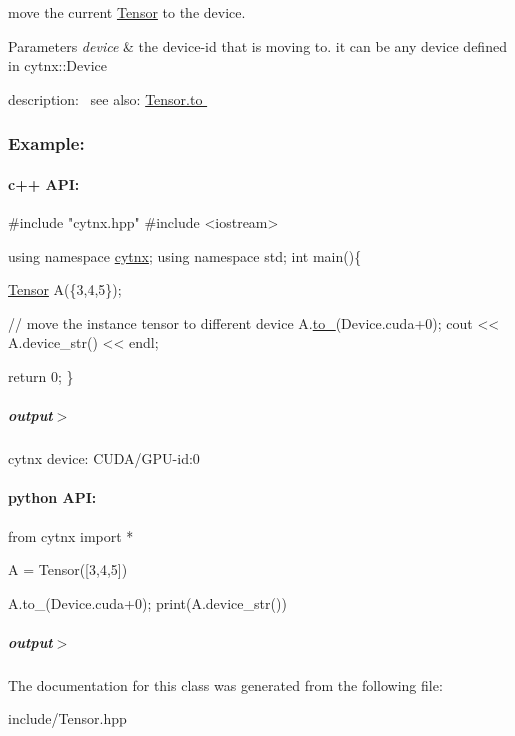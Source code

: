 move the current \hyperlink{classcytnx_1_1Tensor}{Tensor} to the device. 


\begin{DoxyParams}{Parameters}
{\em device} & the device-\/id that is moving to. it can be any device defined in cytnx\+::\+Device\\
\hline
\end{DoxyParams}
description\+:~\newline
 see also\+: \hyperlink{classcytnx_1_1Tensor_acf7f697a9434f9bc98a7d00a555ee982}{Tensor.\+to }~\newline
 \subsubsection*{Example\+:}

\paragraph*{c++ A\+PI\+:}


\begin{DoxyCodeInclude}
\textcolor{preprocessor}{#include "cytnx.hpp"}
\textcolor{preprocessor}{#include <iostream>}


\textcolor{keyword}{using namespace }\hyperlink{namespacecytnx}{cytnx};
\textcolor{keyword}{using namespace }std;
\textcolor{keywordtype}{int} main()\{

    \hyperlink{classcytnx_1_1Tensor}{Tensor} A(\{3,4,5\});

    \textcolor{comment}{// move the instance tensor to different device}
    A.\hyperlink{classcytnx_1_1Tensor_a114a31fbb8bf4a90f150b6a67e42183a}{to\_}(Device.cuda+0);
    cout << A.device\_str() << endl;

    \textcolor{keywordflow}{return} 0;
\}
\end{DoxyCodeInclude}
 \subparagraph*{output$>$}


\begin{DoxyVerbInclude}
cytnx device: CUDA/GPU-id:0
\end{DoxyVerbInclude}
 \paragraph*{python A\+PI\+:}


\begin{DoxyCodeInclude}
\textcolor{keyword}{from} cytnx \textcolor{keyword}{import} *

A = Tensor([3,4,5])

A.to\_(Device.cuda+0);
print(A.device\_str())

\end{DoxyCodeInclude}
 \subparagraph*{output$>$}


\begin{DoxyVerbInclude}
\end{DoxyVerbInclude}
 

The documentation for this class was generated from the following file\+:\begin{DoxyCompactItemize}
\item 
include/Tensor.\+hpp\end{DoxyCompactItemize}
